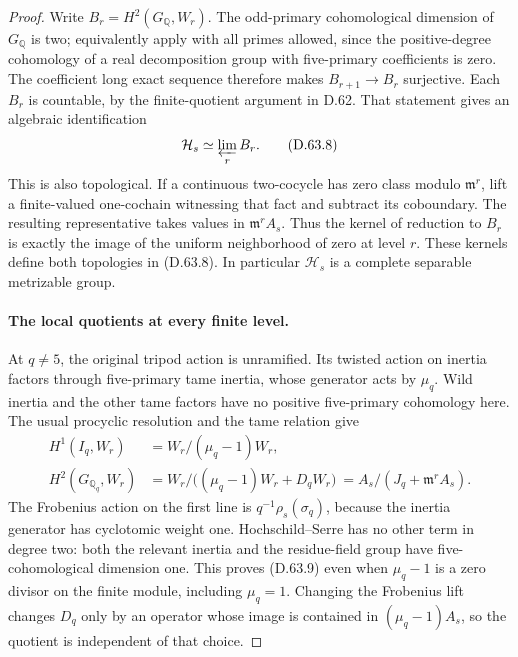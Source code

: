 \begin{proof}
Write \(B_r=H^2(G_{\mathbb Q},W_r)\). The odd-primary
cohomological dimension of \(G_{\mathbb Q}\) is two;
equivalently apply \cite[I, Theorem 4.10(c)]{DE_MilneADT}
with all primes allowed, since the positive-degree
cohomology of a real decomposition group with five-primary
coefficients is zero. The coefficient long exact sequence
therefore makes \(B_{r+1}\to B_r\) surjective. Each
\(B_r\) is countable, by the finite-quotient argument in
D.62. That statement gives an algebraic identification
\[
                    \mathcal H_s\simeq\varprojlim_r B_r.
                                                        \tag{D.63.8}
\]
This is also topological. If a continuous two-cocycle has
zero class modulo \(\mathfrak m^r\), lift a finite-valued
one-cochain witnessing that fact and subtract its
coboundary. The resulting representative takes values
in \(\mathfrak m^rA_s\). Thus the kernel of reduction to
\(B_r\) is exactly the image of the uniform neighborhood
of zero at level \(r\). These kernels define both
topologies in (D.63.8). In particular \(\mathcal H_s\)
is a complete separable metrizable group.

\paragraph{The local quotients at every finite level.}
At \(q\ne5\), the original tripod action is unramified.
Its twisted action on inertia factors through five-primary
tame inertia, whose generator acts by \(\mu_q\).
Wild inertia and the other tame factors have no positive
five-primary cohomology here. The usual procyclic
resolution and the tame relation give
\[
 \begin{split}
 H^1(I_q,W_r)&=W_r/(\mu_q-1)W_r,\\
 H^2(G_{\mathbb Q_q},W_r)
   &=W_r/\bigl((\mu_q-1)W_r+D_qW_r\bigr)\
    =A_s/(J_q+\mathfrak m^rA_s).
 \end{split}                                             \tag{D.63.9}
\]
The Frobenius action on the first line is
\(q^{-1}\rho_s(\sigma_q)\), because the inertia generator
has cyclotomic weight one. Hochschild--Serre has no
other term in degree two: both the relevant inertia and
the residue-field group have five-cohomological dimension
one. This proves (D.63.9) even when \(\mu_q-1\) is a
zero divisor on the finite module, including \(\mu_q=1\).
Changing the Frobenius lift changes \(D_q\) only by an
operator whose image is contained in \((\mu_q-1)A_s\),
so the quotient is independent of that choice.


\end{proof}
